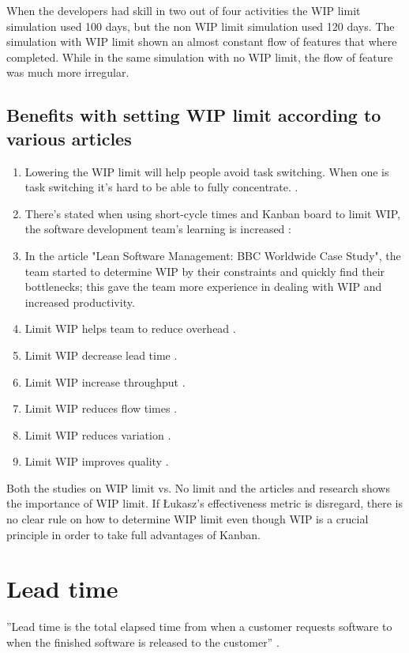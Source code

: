 \documentclass[UKenglish]{ifimaster}  %
\begin{document}
When the developers had skill in two out of four activities the WIP limit simulation used 100 days, but the non WIP limit simulation used 120 days. The simulation with WIP limit shown an almost constant flow of features that where completed. While in the same simulation with no WIP limit, the flow of feature was much more irregular.  
\parencite{DavidAnderson}

\subsection{Benefits with setting WIP limit according to various articles}
\label{sub:sub:benefits}
\begin{enumerate}
\item Lowering the WIP limit will help people avoid task switching. When one is task switching it's hard to be able to fully concentrate. \parencite{Ikonen}.
\item There's stated when using short-cycle times and Kanban board to limit WIP, the software development team's learning is increased \parencite{Joyce}:
\item In the article "Lean Software Management: BBC Worldwide Case Study", the team started to determine WIP by their constraints and quickly find their bottlenecks; this gave the team more experience in dealing with WIP and increased productivity\parencite{Joyce}.
\item Limit WIP helps team to reduce overhead \parencite {CONWIP}.
\item Limit WIP decrease lead time \parencite {CONWIP}.
\item Limit WIP increase throughput \parencite {CONWIP}.
\item Limit WIP reduces flow times \parencite {CONWIP}.
\item Limit WIP reduces variation \parencite {CONWIP}.
\item Limit WIP improves quality \parencite {CONWIP}.
\end{enumerate}

Both the studies on WIP limit vs. No limit and the articles and research shows the importance of WIP limit. If  \L ukasz's effectiveness metric is disregard, there is no clear rule on how to determine WIP limit even though WIP is a crucial principle in order to take full advantages of Kanban.

\section {Lead time}
''Lead time is the total elapsed time from when a customer requests software to when the finished software is released to the customer'' \parencite{Joyce}.
\end{document}
